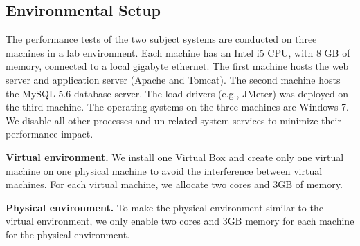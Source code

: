 \subsection{Environmental Setup}

The performance tests of the two subject systems are conducted on three machines in a lab environment. Each machine has an Intel i5  CPU, with 8 GB of memory, connected to a local gigabyte ethernet. The first machine hosts the web server and application server (Apache and Tomcat). The second machine hosts the MySQL 5.6 database server. The load drivers (e.g., JMeter) was deployed on the third machine. The operating systems on the three machines are Windows 7. We disable all other processes and un-related system services to minimize their performance impact.

\noindent \textbf{Virtual environment.} We install one Virtual Box  and create only one virtual machine on one physical machine to avoid the interference between virtual machines. For each virtual machine, we allocate two cores and 3GB of memory. 


\noindent \textbf{Physical environment.} To make the physical environment similar to the virtual environment, we only enable two cores and 3GB memory for each machine for the physical environment. 


